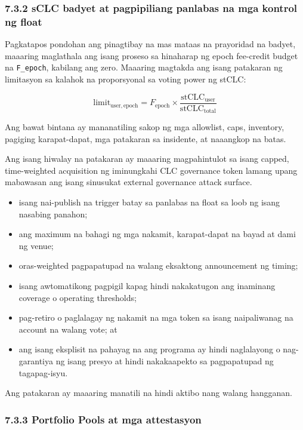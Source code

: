 \documentclass[11pt]{article}
\begin{document}
\subsubsection*{7.3.2 sCLC badyet at pagpipiliang panlabas na mga kontrol ng float}

Pagkatapos pondohan ang pinagtibay na mas mataas na prayoridad na badyet, maaaring maglathala ang isang proseso sa hinaharap ng epoch fee-credit budget na \texttt{F\_epoch}, kabilang ang zero. Maaaring magtakda ang isang patakaran ng limitasyon sa kalahok na proporsyonal sa voting power ng stCLC:

\[
\mathrm{limit}_{\mathrm{user,epoch}} = F_{\mathrm{epoch}} \times \frac{\mathrm{stCLC}_{\mathrm{user}}}{\mathrm{stCLC}_{\mathrm{total}}}
\]

Ang bawat bintana ay mananatiling sakop ng mga allowlist, caps, inventory, pagiging karapat-dapat, mga patakaran sa insidente, at naaangkop na batas.

Ang isang hiwalay na patakaran ay maaaring magpahintulot sa isang capped, time-weighted acquisition ng iminungkahi CLC governance token lamang upang mabawasan ang isang sinusukat external governance attack surface.

\begin{itemize}[leftmargin=*]
\item isang nai-publish na trigger batay sa panlabas na float sa loob ng isang nasabing panahon;
\item ang maximum na bahagi ng mga nakamit, karapat-dapat na bayad at dami ng venue;
\item oras-weighted pagpapatupad na walang eksaktong announcement ng timing;
\item isang awtomatikong pagpigil kapag hindi nakakatugon ang inaminang coverage o operating thresholds;
\item pag-retiro o paglalagay ng nakamit na mga token sa isang naipaliwanag na account na walang vote; at
\item ang isang eksplisit na pahayag na ang programa ay hindi naglalayong o nag-garantiya ng isang presyo at hindi nakakaapekto sa pagpapatupad ng tagapag-isyu.
\end{itemize}
Ang patakaran ay maaaring manatili na hindi aktibo nang walang hangganan.

\subsubsection*{7.3.3 Portfolio Pools at mga attestasyon}
\end{document}
